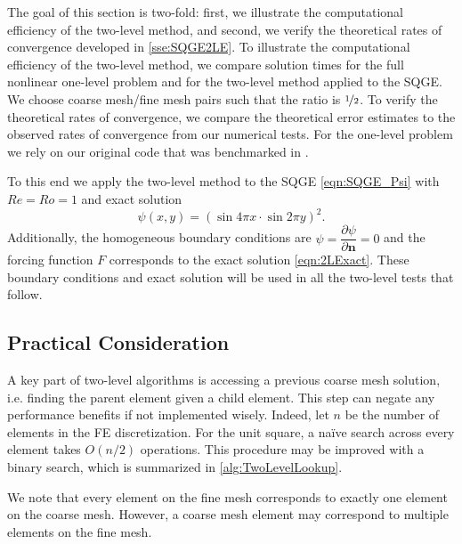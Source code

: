 The goal of this section is two-fold: first, we illustrate the computational
efficiency of the two-level method, and second, we verify the theoretical rates
of convergence developed in \autoref{sse:SQGE2LE}.  To illustrate the
computational efficiency of the two-level method, we compare solution times for
the full nonlinear one-level problem and for the two-level method applied to the
SQGE. We choose coarse mesh/fine mesh pairs such that the ratio is
$\nicefrac{1}{2}$. To verify the theoretical rates of convergence, we compare
the theoretical error estimates to the observed rates of convergence from our
numerical tests. For the one-level problem we rely on our original code that was
benchmarked in \cite{Foster}.

To this end we apply the two-level method to the SQGE \eqref{eqn:SQGE_Psi}
with $Re=Ro=1$ and exact solution
\begin{equation}
  \psi(x,y) = \left(\sin 4\pi x \cdot \sin 2\pi y\right)^2.
  \label{eqn:2LExact}
\end{equation}
Additionally, the homogeneous boundary conditions are $\psi=\dfrac{\partial
\psi}{\partial \mathbf{n}}=0$ and the forcing function $F$ corresponds to the exact
solution \eqref{eqn:2LExact}. These boundary conditions and exact solution will
be used in all the two-level tests that follow.

\subsection{Practical Consideration}
A key part of two-level algorithms is accessing a previous coarse mesh solution,
i.e. finding the parent element given a child element. This step can negate any
performance benefits if not implemented wisely. Indeed, let $ n $ be the number
of elements in the FE discretization. For the unit square, a na\"{i}ve search
across every element takes $ O(n/2) $ operations. This procedure may be improved
with a binary search, which is summarized in \autoref{alg:TwoLevelLookup}.

We note that every element on the fine mesh corresponds to exactly one element
on the coarse mesh. However, a coarse mesh element may correspond to multiple
elements on the fine mesh.

